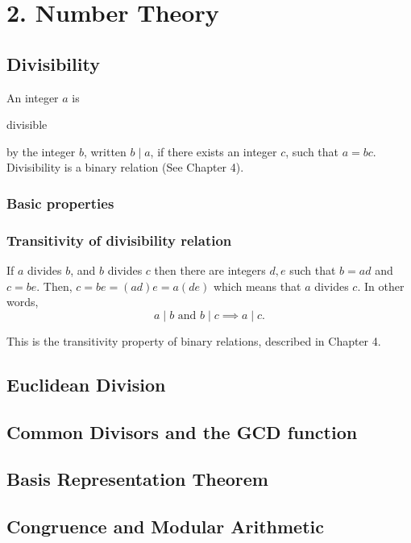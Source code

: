 \documentclass[11pt]{article}
\theoremstyle{plain}
\theoremstyle{definition}
\begin{document}
\section*{2. Number Theory}

\subsection*{Divisibility}

An integer $a$ is \begin{em}divisible\end{em} by the integer $b$, written $b \mid a$, if there exists an integer $c$, such that $ a = bc. $ Divisibility is a binary relation (See Chapter 4).

\subsubsection*{Basic properties}

\subsubsection*{Transitivity of divisibility relation}

If $a$ divides $b$, and $b$ divides $c$ then there are integers $d, e$ such that $b = ad$ and $c = be$. Then, $ c = be = (ad)e = a(de) $ which means that $a$ divides $c$. In other words,
$$ a \mid b \text{ and } b \mid c \implies a \mid c.  $$

This is the transitivity property of binary relations, described in Chapter 4.

\subsection*{Euclidean Division}

\subsection*{Common Divisors and the GCD function}

\subsection*{Basis Representation Theorem}

\subsection*{Congruence and Modular Arithmetic}
\end{document}

